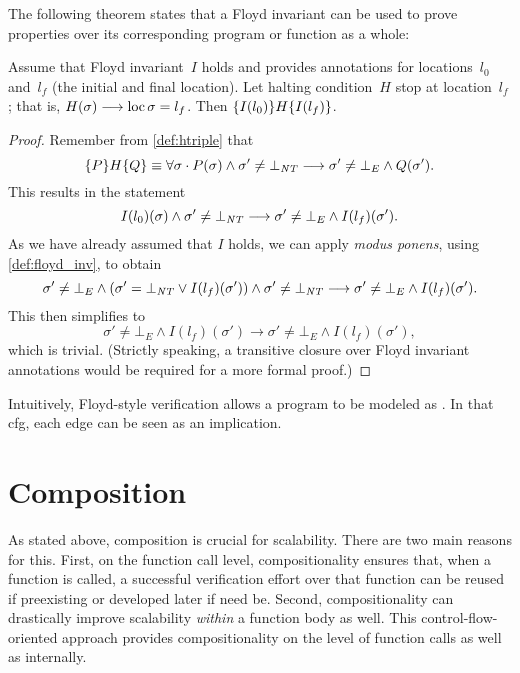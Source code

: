 The following theorem states that a Floyd invariant
can be used to prove properties over its corresponding program or function
as a whole:
\begin{theorem}
  Assume that Floyd invariant~$I$ holds and provides annotations for locations~$l_0$ and~$l_f$ (the initial and final location).
  Let halting condition~$H$ stop at location~$l_f$;
  that is, $H(\sigma)\longrightarrow\operatorname{loc}\sigma=l_f$.
  Then $\{I(l_0)\}H\{I(l_f)\}$.
\end{theorem}
\begin{proof}
  Remember from \cref{def:htriple} that
  \begin{equation*}
    \{P\}H\{Q\}\equiv\forall\sigma\cdot
    P(\sigma)\wedge\sigma'\neq\bot_{\mathit{NT}}\longrightarrow
    \sigma'\neq\bot_E\wedge Q(\sigma').
  \end{equation*}
  This results in the statement
  \begin{equation*}
      I(l_0)(\sigma)\wedge\sigma'\neq\bot_{\mathit{NT}}\longrightarrow
      \sigma'\neq\bot_E\wedge I(l_f)(\sigma').
  \end{equation*}
  As we have already assumed that $I$ holds,
  we can apply \emph{modus ponens}, using \cref{def:floyd_inv},  
  to obtain
  \begin{equation*}
    \sigma'\neq\bot_E\wedge(\sigma'=\bot_{\mathit{NT}}\vee I(l_f)(\sigma'))\wedge
    \sigma'\neq\bot_{\mathit{NT}}\longrightarrow
    \sigma'\neq\bot_E\wedge I(l_f)(\sigma').
  \end{equation*}
  This then simplifies to 
  \begin{equation*}
    \sigma'\neq\bot_E\wedge I(l_f)(\sigma')\longrightarrow
    \sigma'\neq\bot_E\wedge I(l_f)(\sigma'),
  \end{equation*}
  which is trivial.
  (Strictly speaking, a transitive closure over Floyd invariant annotations
  would be required for a more formal proof.)
\end{proof}

Intuitively, Floyd-style verification allows a program to be modeled as .
In that \ac{cfg}, each edge can be seen as an implication.

\section{Composition}\label{se:composition}
As stated above, composition is crucial for scalability.
There are two main reasons for this. First, on the function call level,
compositionality ensures that, when a function is called,
a successful verification effort over that function can be reused
if preexisting or developed later if need be.
Second, compositionality can drastically improve scalability
\emph{within} a function body as well.
This control-flow-oriented approach provides compositionality
on the level of function calls as well as internally.

